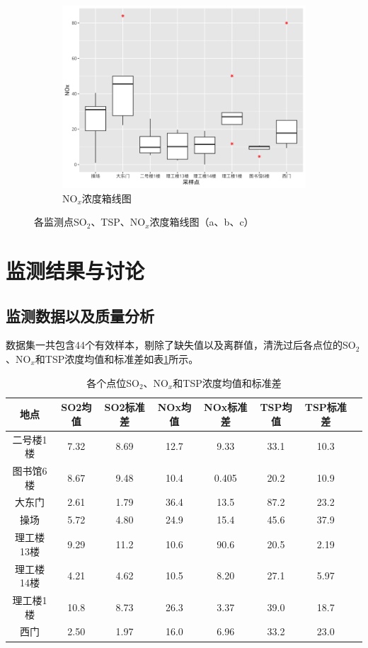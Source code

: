 \documentclass[12pt,hyperref,a4paper,UTF8]{ctexart}
\begin{document}
\begin{figure}[!htbp]
\begin{subfigure}[b]{0.32\textwidth}
        \includegraphics[width=\textwidth]{dataout/NOx_boxplot.png}
        \caption{NO$_x$浓度箱线图}
        \label{fig:NOx_boxplot}
    \end{subfigure}
    \caption{各监测点SO$_2$、TSP、NO$_x$浓度箱线图（a、b、c）}
    \label{fig:boxplots}
\end{figure}

\section{监测结果与讨论}
\subsection{监测数据以及质量分析}
数据集一共包含44个有效样本，剔除了缺失值以及离群值，清洗过后各点位的SO$_2$、NO$_x$和TSP浓度均值和标准差如表\ref{tab:pollutant_concentration}所示。

\begin{table}[htbp]
\centering
\caption{各个点位SO$_2$、NO$_x$和TSP浓度均值和标准差}
\label{tab:pollutant_concentration}
\begin{tabular}{cccccccc}
\hline
地点 & SO2均值 & SO2标准差 & NOx均值 & NOx标准差 & TSP均值 & TSP标准差 \\
\hline
二号楼1楼 & 7.32 & 8.69 & 12.7 & 9.33 & 33.1 & 10.3 \\
图书馆6楼 & 8.67 & 9.48 & 10.4 & 0.405 & 20.2 & 10.9 \\
大东门 & 2.61 & 1.79 & 36.4 & 13.5 & 87.2 & 23.2 \\
操场 & 5.72 & 4.80 & 24.9 & 15.4 & 45.6 & 37.9 \\
理工楼13楼 & 9.29 & 11.2 & 10.6 & 90.6 & 20.5 & 2.19 \\
理工楼14楼 & 4.21 & 4.62 & 10.5 & 8.20 & 27.1 & 5.97 \\
理工楼1楼 & 10.8 & 8.73 & 26.3 & 3.37 & 39.0 & 18.7 \\
西门 & 2.50 & 1.97 & 16.0 & 6.96 & 33.2 & 23.0 \\
\hline
\end{tabular}
\end{table}
\end{document}

